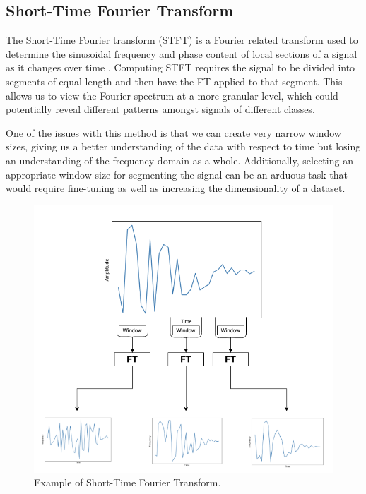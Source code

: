 \documentclass{turabian-thesis}
\begin{document}
\subsection{Short-Time Fourier Transform}
The Short-Time Fourier transform (STFT) is a Fourier related transform used to determine the sinusoidal frequency and phase content of local sections of a signal as it changes over time \cite{hill_uncertainty_nodate}.
Computing STFT requires the signal to be divided into segments of equal length and then have the FT applied to that segment. This allows us to view the Fourier spectrum at a more granular level, which could potentially reveal different patterns amongst signals of different classes.


One of the issues with this method is that we can create very narrow window sizes, giving us a better understanding of the data with respect to time but losing an understanding of the frequency domain as a whole. Additionally, selecting an appropriate window size for segmenting the signal can be an arduous task that would require fine-tuning as well as increasing the dimensionality of a dataset.


\begin{figure}[h!]
   \begin{center}
      \includegraphics[scale=0.6]{../media/stft.png}
   \end{center}
   \caption{Example of Short-Time Fourier Transform.}
   \label{fig:stft_example}
\end{figure}
\end{document}
